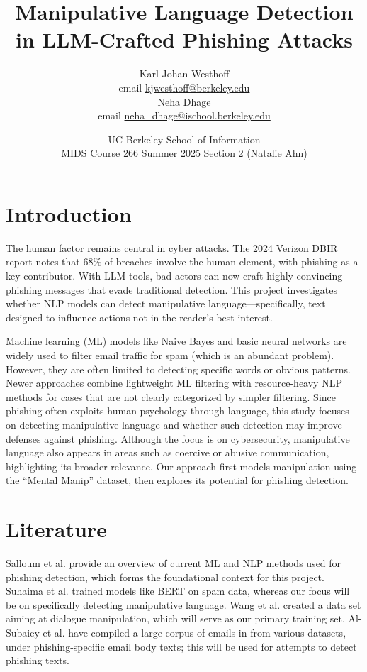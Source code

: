 \documentclass[
	letterpaper, %
	12pt, %
	unnumberedsections, %
	twoside, %
]{LTJournalArticle}
\title{Manipulative Language Detection in LLM-Crafted
Phishing Attacks
}  %
\author{
	Karl-Johan Westhoff \\
	email \href{mailto:kjwesthoff@berkeley.edu}{kjwesthoff@berkeley.edu} \\
    Neha Dhage \\
	email \href{mailto:neha_dhage@ischool.berkeley.edu}{neha\_dhage@ischool.berkeley.edu}
}
\date{UC Berkeley School of Information \\
MIDS Course 266 Summer 2025 Section 2 (Natalie Ahn) \\
}
\begin{document}
\maketitle %
\section{Introduction}
The human factor remains central in cyber attacks. The 2024 Verizon DBIR report \cite{verizon2024dbir} notes that 68\% of breaches involve the human element, with phishing as a key contributor. With LLM tools, bad actors can now craft highly convincing phishing messages that evade traditional detection.
This project investigates whether NLP models can detect manipulative language—specifically, text designed to influence actions not in the reader's best interest.

Machine learning (ML) models like Naive Bayes and basic neural networks are widely used to filter email traffic for spam (which is an abundant problem). However, they are often limited to detecting specific words or obvious patterns. Newer approaches combine lightweight ML filtering with resource-heavy NLP methods for cases that are not clearly categorized by simpler filtering. Since phishing often exploits human psychology through language, this study focuses on detecting manipulative language and whether such detection may improve defenses against phishing. Although the focus is on cybersecurity, manipulative language also appears in areas such as coercive or abusive communication, highlighting its broader relevance. Our approach first models manipulation using the “Mental Manip” dataset, then explores its potential for phishing detection.

\section{Literature}
Salloum et al. \cite{SALLOUM202119} provide an overview of current ML and NLP methods used for phishing detection, which forms the foundational context for this project.
Suhaima et al. \cite{ImprovedPhishing} trained models like BERT on spam data, whereas our focus will be on specifically detecting manipulative language.
Wang et al. \cite{MentalManip} created a data set aiming at dialogue manipulation, which will serve as our primary training set.
Al-Subaiey et al. have compiled a large corpus of emails in \cite{PhishingEmailDataset} from various datasets, under phishing-specific email body texts; this will be used for attempts to detect phishing texts.
\end{document}
